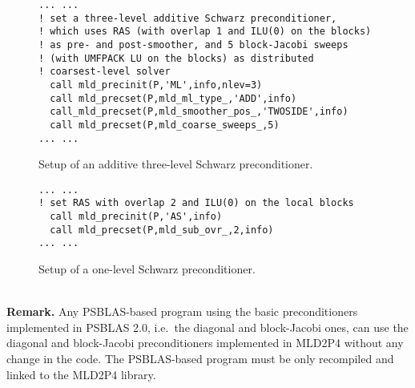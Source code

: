 \begin{figure}[htb]
\begin{center}
{\small
\begin{verbatim}
... ...
! set a three-level additive Schwarz preconditioner,
! which uses RAS (with overlap 1 and ILU(0) on the blocks)
! as pre- and post-smoother, and 5 block-Jacobi sweeps
! (with UMFPACK LU on the blocks) as distributed
! coarsest-level solver
  call mld_precinit(P,'ML',info,nlev=3)
  call mld_precset(P,mld_ml_type_,'ADD',info)
  call_mld_precset(P,mld_smoother_pos_,'TWOSIDE',info)
  call mld_precset(P,mld_coarse_sweeps_,5)
... ...
\end{verbatim}
}
\caption{Setup of an additive three-level Schwarz preconditioner.\label{fig:ex_3la}}
\end{center}
\end{figure}

\begin{figure}[htb]
\begin{center}
{\small
\begin{verbatim}
... ...
! set RAS with overlap 2 and ILU(0) on the local blocks
  call mld_precinit(P,'AS',info)
  call mld_precset(P,mld_sub_ovr_,2,info)
... ...
\end{verbatim}
}
\caption{Setup of a one-level Schwarz preconditioner.\label{fig:ex_1l}}
\end{center}
\end{figure}

\ \\
\textbf{Remark.} Any PSBLAS-based program using the basic preconditioners
implemented in PSBLAS 2.0, i.e.\ the diagonal and block-Jacobi ones,
can use the diagonal and block-Jacobi preconditioners
implemented in MLD2P4 without any change in the code.
The PSBLAS-based program must be only recompiled
and linked to the MLD2P4 library.

